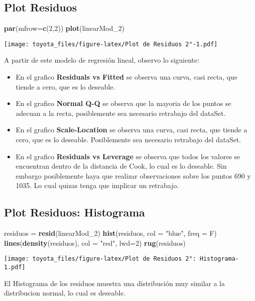 \documentclass[]{article}
\newenvironment{Shaded}{\begin{snugshade}}{\end{snugshade}}
\newcommand{\DataTypeTok}[1]{\textcolor[rgb]{0.13,0.29,0.53}{#1}}
\newcommand{\DecValTok}[1]{\textcolor[rgb]{0.00,0.00,0.81}{#1}}
\newcommand{\KeywordTok}[1]{\textcolor[rgb]{0.13,0.29,0.53}{\textbf{#1}}}
\newcommand{\NormalTok}[1]{#1}
\newcommand{\StringTok}[1]{\textcolor[rgb]{0.31,0.60,0.02}{#1}}
\providecommand{\tightlist}{%
  \setlength{\itemsep}{0pt}\setlength{\parskip}{0pt}}
\begin{document}
\hypertarget{plot-residuos-2}{%
\subsection{Plot Residuos}\label{plot-residuos-2}}

\begin{Shaded}
\begin{Highlighting}[]
\KeywordTok{par}\NormalTok{(}\DataTypeTok{mfrow=}\KeywordTok{c}\NormalTok{(}\DecValTok{2}\NormalTok{,}\DecValTok{2}\NormalTok{))}
\KeywordTok{plot}\NormalTok{(linearMod_}\DecValTok{2}\NormalTok{)}
\end{Highlighting}
\end{Shaded}

\texttt{[image: toyota\_files/figure-latex/Plot de Residuos 2°-1.pdf]}

A partir de este modelo de regresión lineal, observo lo siguiente:

\begin{itemize}
\tightlist
\item
  En el grafico \textbf{Residuals vs Fitted} se observa una curva, casi
  recta, que tiende a cero, que es lo deseable.\\
\item
  En el grafico \textbf{Normal Q-Q} se observa que la mayoria de los
  puntos se adecuan a la recta, posiblemente sea necesario retrabajo del
  dataSet.\\
\item
  En el grafico \textbf{Scale-Location} se observa una curva, casi
  recta, que tiende a cero, que es lo deseable. Posiblemente sea
  necesario retrabajo del dataSet.\\
\item
  En el grafico \textbf{Residuals vs Leverage} se observa que todos los
  valores se encuentran dentro de la distancia de Cook, lo cual es lo
  deseable. Sin embargo posiblemente haya que realizar observaciones
  sobre los puntos 690 y 1035. Lo cual quizas tenga que implicar un
  retrabajo.
\end{itemize}

\hypertarget{plot-residuos-histograma-2}{%
\subsection{Plot Residuos:
Histograma}\label{plot-residuos-histograma-2}}

\begin{Shaded}
\begin{Highlighting}[]
\NormalTok{residuos =}\StringTok{ }\KeywordTok{resid}\NormalTok{(linearMod_}\DecValTok{2}\NormalTok{)}
\KeywordTok{hist}\NormalTok{(residuos, }\DataTypeTok{col =} \StringTok{"blue"}\NormalTok{, }\DataTypeTok{freq =}\NormalTok{ F)}
\KeywordTok{lines}\NormalTok{(}\KeywordTok{density}\NormalTok{(residuos), }\DataTypeTok{col =} \StringTok{"red"}\NormalTok{, }\DataTypeTok{lwd=}\DecValTok{2}\NormalTok{)}
\KeywordTok{rug}\NormalTok{(residuos)}
\end{Highlighting}
\end{Shaded}

\texttt{[image: toyota\_files/figure-latex/Plot de Residuos 2°: Histograma-1.pdf]}

El Histograma de los residuos muestra una distribución muy similar a la
distribucion normal, lo cual es deseable.
\end{document}
